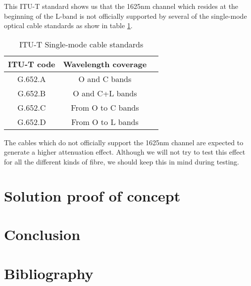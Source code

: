\documentclass{article}
\begin{document}
This ITU-T standard shows us that the 1625nm channel which resides at the beginning of the L-band is not officially supported by several of the single-mode optical cable standards as show in table \ref{tab:single-mode_types}.

\begin{table}[h]
\centering
\label{tab:single-mode_types}
\caption{ITU-T Single-mode cable standards}
\begin{tabular}{|c|c|c|}
\hline 
ITU-T code & Wavelength coverage\\ 
\hline 
G.652.A & O and C bands \\ 
\hline
G.652.B & O and C+L bands \\
\hline
G.652.C & From O to C bands \\
\hline
G.652.D & From O to L bands \\
\hline
\end{tabular} 
\end{table}

The cables which do not officially support the 1625nm channel are expected to generate a higher attenuation effect. Although we will not try to test this effect for all the different kinds of fibre, we should keep this in mind during testing.

\section{Solution proof of concept}

\section{Conclusion}

\section{Bibliography}


\end{document}
